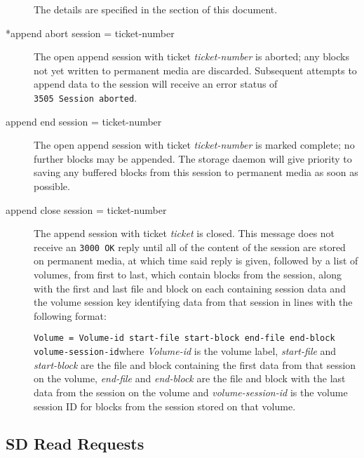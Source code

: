 \begin{description}
The details are specified in the 
  section of this
document.  

\item [*append abort session = \lt{}ticket-number\gt{}  ]
   The open append session with ticket {\it ticket-number} is aborted; any blocks
not yet written to permanent media are discarded. Subsequent attempts to 
append data to the session will receive an error status of  {\tt 3505\
Session\ aborted}.  

\item [append end session = \lt{}ticket-number\gt{}  ]
   The open append session with ticket {\it ticket-number} is marked complete; no
further blocks may be appended. The storage daemon will give priority to
saving  any buffered blocks from this session to permanent media as soon as
possible.  

\item [append close session = \lt{}ticket-number\gt{}  ]
   The append session with ticket {\it ticket} is closed. This message  does not
receive an {\tt 3000\ OK} reply until all of the content of the  session are
stored on permanent media, at which time said reply is given,  followed by a
list of volumes, from first to last, which contain blocks from  the session,
along with the first and last file and block on each containing  session data
and the volume session key identifying data from that session in  lines with
the following format:  

{\tt {\tt Volume = }\lt{}Volume-id\gt{} \lt{}start-file\gt{}
\lt{}start-block\gt{}  \lt{}end-file\gt{} \lt{}end-block\gt{}
\lt{}volume-session-id\gt{}}where {\it Volume-id} is the volume label,  {\it
start-file} and {\it start-block} are the file and block containing the  first
data from that session on the volume, {\it end-file} and  {\it end-block} are
the file and block with the last data from the session on  the volume and {\it
volume-session-id} is the volume session ID for blocks from the  session
stored on that volume. 
\end{description}

\subsection{SD Read Requests}

